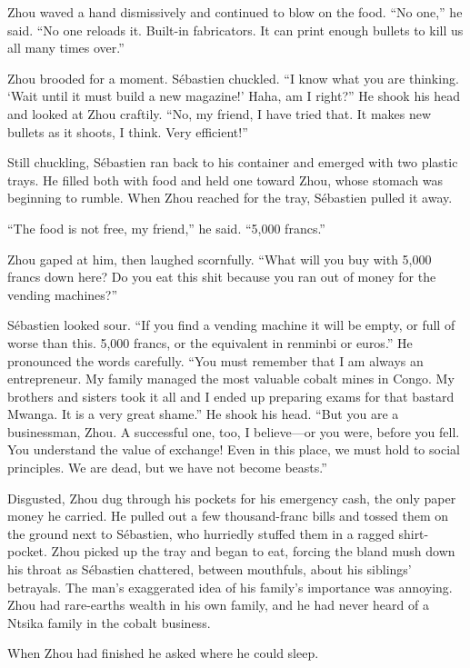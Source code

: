 \documentclass[10pt,b5paper]{article}
\begin{document}
Zhou waved a hand dismissively and continued to blow on the food.
``No one,'' he said. ``No one reloads it. Built-in fabricators.
It can print enough bullets to kill us all many times over.''

Zhou brooded for a moment. S\'{e}bastien chuckled. ``I know what you
are thinking. `Wait until it must build a new magazine!' Haha,
am I right?'' He shook his head and looked at Zhou craftily. ``No,
my friend, I have tried that. It makes new bullets as it shoots,
I think. Very efficient!''

Still chuckling, S\'{e}bastien ran back to his container and emerged
with two plastic trays. He filled both with food and held one toward
Zhou, whose stomach was beginning to rumble. When Zhou reached for
the tray, S\'{e}bastien pulled it away.

``The food is not free, my friend,'' he said. ``5,000 francs.''

Zhou gaped at him, then laughed scornfully. ``What will you buy with
5,000 francs down here? Do you eat this shit because you ran out
of money for the vending machines?''

S\'{e}bastien looked sour. ``If you find a vending machine it will be
empty, or full of worse than this. 5,000 francs, or the equivalent
in renminbi or euros.'' He pronounced the words carefully. ``You must
remember that I am always an entrepreneur. My family managed the most
valuable cobalt mines in Congo. My brothers and sisters took it all
and I ended up preparing exams for that bastard Mwanga. It is a very
great shame.'' He shook his head. ``But you are a businessman, Zhou. A
successful one, too, I believe---or you were, before you fell. You
understand the value of exchange! Even in this place, we must hold
to social principles. We are dead, but we have not become beasts.''

Disgusted, Zhou dug through his pockets for his emergency cash,
the only paper money he carried. He pulled out a few thousand-franc
bills and tossed them on the ground next to S\'{e}bastien, who hurriedly
stuffed them in a ragged shirt-pocket. Zhou picked up the tray and
began to eat, forcing the bland mush down his throat as S\'{e}bastien
chattered, between mouthfuls, about his siblings' betrayals.
The man's exaggerated idea of his family's importance was annoying.
Zhou had rare-earths wealth in his own family, and he had never
heard of a Ntsika family in the cobalt business.

When Zhou had finished he asked where he could sleep.
\end{document}
